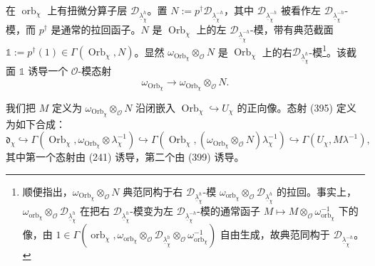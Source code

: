 在 $\operatorname{orb}_{\chi}$ 上有扭微分算子层 $\mathcal{D}_{\underline{\lambda}_{\chi}^{h}}$。置 $N:=p^{\dagger}\mathcal{D}_{\underline{\lambda}_{\chi}^{-h}}$，其中 $\mathcal{D}_{\underline{\lambda}_{\chi}^{-h}}$ 被看作左 $\mathcal{D}_{\underline{\lambda}_{\chi}^{-h}}$-模，而 $p^{\dagger}$ 是通常的拉回函子。$N$ 是 $\operatorname{Orb}_{\chi}$ 上的左 $\mathcal{D}_{\underline{\lambda}_{\chi}^{-h}}$-模，带有典范截面 $\mathbb{1}:=p^{\dagger}(1)\in\Gamma(\operatorname{Orb}_{\chi},N)$。显然 $\omega_{\operatorname{Orb}_{\chi}}\otimes_{\mathcal{O}}N$ 是 $\operatorname{Orb}_{\chi}$ 上的右$\mathcal{D}_{\underline{\lambda}_{\chi}^{h}}$-模\footnote{顺便指出，$\omega_{\operatorname{Orb}_{\chi}}\otimes_{\mathcal{O}}N$ 典范同构于右 $\mathcal{D}_{\underline{\lambda}_{\chi}^{h}}$-模 $\omega_{\operatorname{orb}_{\chi}}\otimes_{\mathcal{O}}\mathcal{D}_{\underline{\lambda}_{\chi}^{h}}$ 的拉回。事实上，$\omega_{\operatorname{orb}_{\chi}}\otimes_{\mathcal{O}}\mathcal{D}_{\underline{\lambda}_{\chi}^{h}}$ 在把右 $\mathcal{D}_{\underline{\lambda}_{\chi}^{h}}$-模变为左 $\mathcal{D}_{\underline{\lambda}_{\chi}^{-h}}$-模的通常函子 $M\mapsto M\otimes_{\mathcal{O}}\omega_{\operatorname{orb}_{\chi}}^{-1}$ 下的像，由 $1\in\Gamma(\operatorname{orb}_{\chi},\omega_{\operatorname{orb}_{\chi}}\otimes_{\mathcal{O}}\mathcal{D}_{\underline{\lambda}_{\chi}^{h}}\otimes_{\mathcal{O}}\omega_{\operatorname{orb}_{\chi}}^{-1})$ 自由生成，故典范同构于 $\mathcal{D}_{\underline{\lambda}_{\chi}^{-h}}$。}。该截面 $\mathbb{1}$ 诱导一个 $\mathcal{O}$-模态射
\begin{equation}\tag{399}
\omega_{\operatorname{Orb}_{\chi}}\to\omega_{\operatorname{Orb}_{\chi}}\otimes_{\mathcal{O}}N.
\end{equation}

我们把 $M$ 定义为 $\omega_{\operatorname{Orb}_{\chi}}\otimes_{\mathcal{O}}N$ 沿闭嵌入 $\operatorname{Orb}_{\chi}\hookrightarrow U_{\chi}$ 的正向像。态射 (395) 定义为如下合成：
\[
\mathfrak{d}_{\chi}\hookrightarrow\Gamma(\operatorname{Orb}_{\chi},\omega_{\operatorname{Orb}_{\chi}}\otimes\lambda_{\chi}^{-1})\hookrightarrow\Gamma(\operatorname{Orb}_{\chi},(\omega_{\operatorname{Orb}_{\chi}}\otimes_{\mathcal{O}}N)\lambda_{\chi}^{-1})\hookrightarrow\Gamma(U_{\chi},M\lambda^{-1}),
\]
其中第一个态射由 (241) 诱导，第二个由 (399) 诱导。

